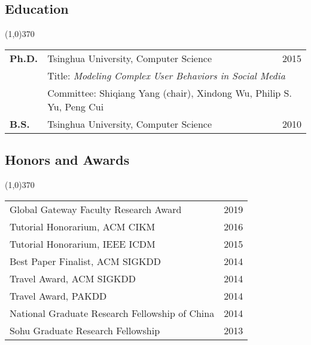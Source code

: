 \documentclass[10pt]{article}
\newcounter{list}
\begin{document}
\vspace{-0.2cm}
\subsection{\sc Education}
\vspace{-0.4cm} \line(1,0){370} \vspace{-0.1cm}

\begin{table}[h!]
\begin{tabular*}{12.7cm}{p{1.15cm}p{8.25cm}r}
\bf{Ph.D.}&Tsinghua University, Computer Science&2015\\
 &\multicolumn{2}{l}{\small Title: \emph{Modeling Complex User Behaviors in Social Media}}\\
 &\multicolumn{2}{l}{\small Committee: Shiqiang Yang (chair), Xindong Wu, Philip S. Yu, Peng Cui\vspace{0.2cm}}\\
\bf{B.S.}&Tsinghua University, Computer Science&2010\\

\end{tabular*}
\end{table}

\vspace{-0.6cm}
\subsection{\sc Honors and Awards}
\vspace{-0.4cm} \line(1,0){370} \vspace{-0.1cm}

\begin{table}[h!]
\begin{tabular*}{12.7cm}{p{11.65cm}r}
Global Gateway Faculty Research Award&2019 \\
Tutorial Honorarium, ACM CIKM&2016 \\
Tutorial Honorarium, IEEE ICDM&2015 \\
Best Paper Finalist, ACM SIGKDD&2014 \\
Travel Award, ACM SIGKDD&2014 \\
Travel Award, PAKDD&2014 \\
National Graduate Research Fellowship of China&2014 \\
Sohu Graduate Research Fellowship&2013 \\
\end{tabular*}
\end{table}
\end{document}
